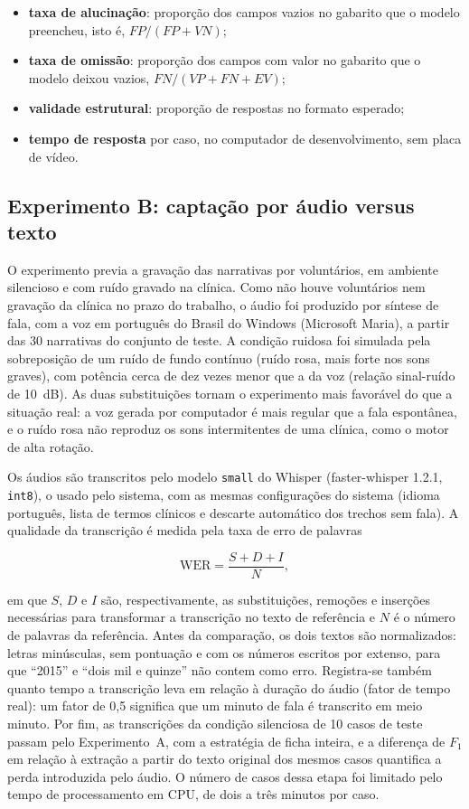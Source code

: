 \begin{itemize}
	\item \textbf{taxa de alucinação}: proporção dos campos vazios no gabarito que o modelo preencheu, isto é, $FP/(FP+VN)$;
	\item \textbf{taxa de omissão}: proporção dos campos com valor no gabarito que o modelo deixou vazios, $FN/(VP+FN+EV)$;
	\item \textbf{validade estrutural}: proporção de respostas no formato esperado;
	\item \textbf{tempo de resposta} por caso, no computador de desenvolvimento, sem placa de vídeo.
\end{itemize}

\subsection{Experimento B: captação por áudio versus texto}
\label{sec:exp-audio}

O experimento previa a gravação das narrativas por voluntários, em ambiente silencioso e com ruído gravado na clínica. Como não houve voluntários nem gravação da clínica no prazo do trabalho, o áudio foi produzido por síntese de fala, com a voz em português do Brasil do Windows (Microsoft Maria), a partir das 30 narrativas do conjunto de teste. A condição ruidosa foi simulada pela sobreposição de um ruído de fundo contínuo (ruído rosa, mais forte nos sons graves), com potência cerca de dez vezes menor que a da voz (relação sinal-ruído de 10~dB). As duas substituições tornam o experimento mais favorável do que a situação real: a voz gerada por computador é mais regular que a fala espontânea, e o ruído rosa não reproduz os sons intermitentes de uma clínica, como o motor de alta rotação.

Os áudios são transcritos pelo modelo \texttt{small} do Whisper (faster-whisper 1.2.1, \texttt{int8}), o usado pelo sistema, com as mesmas configurações do sistema (idioma português, lista de termos clínicos e descarte automático dos trechos sem fala). A qualidade da transcrição é medida pela taxa de erro de palavras

\begin{equation}
	\mathrm{WER} = \frac{S + D + I}{N},
\end{equation}

\noindent em que $S$, $D$ e $I$ são, respectivamente, as substituições, remoções e inserções necessárias para transformar a transcrição no texto de referência e $N$ é o número de palavras da referência. Antes da comparação, os dois textos são normalizados: letras minúsculas, sem pontuação e com os números escritos por extenso, para que ``2015'' e ``dois mil e quinze'' não contem como erro. Registra-se também quanto tempo a transcrição leva em relação à duração do áudio (fator de tempo real): um fator de 0,5 significa que um minuto de fala é transcrito em meio minuto. Por fim, as transcrições da condição silenciosa de 10 casos de teste passam pelo Experimento~A, com a estratégia de ficha inteira, e a diferença de $F_1$ em relação à extração a partir do texto original dos mesmos casos quantifica a perda introduzida pelo áudio. O número de casos dessa etapa foi limitado pelo tempo de processamento em CPU, de dois a três minutos por caso.

